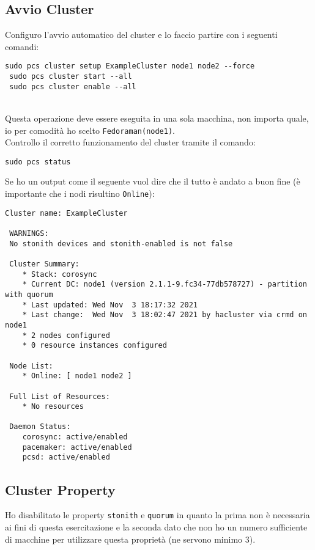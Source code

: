 \subsection{Avvio Cluster}

Configuro l'avvio automatico del cluster e lo faccio partire con i seguenti comandi:

\begin{lstlisting}[style=cmd]
 sudo pcs cluster setup ExampleCluster node1 node2 --force
 sudo pcs cluster start --all
 sudo pcs cluster enable --all
\end{lstlisting}
\ \\
Questa operazione deve essere eseguita in una sola macchina, non importa quale, io per comodit\`{a} ho scelto \lstinline[style=cmd]|Fedoraman(node1)|.
\ \\
Controllo il corretto funzionamento del cluster tramite il comando:

\begin{lstlisting}[style=cmd]
 sudo pcs status
\end{lstlisting}
\pagebreak
Se ho un output come il seguente vuol dire che il tutto \`{e} andato a buon fine (\`{e} importante che i nodi risultino \lstinline[style=cmd]|Online|):

\begin{lstlisting}[style=output]
 Cluster name: ExampleCluster
 
 WARNINGS:
 No stonith devices and stonith-enabled is not false
 
 Cluster Summary:
    * Stack: corosync
    * Current DC: node1 (version 2.1.1-9.fc34-77db578727) - partition with quorum
    * Last updated: Wed Nov  3 18:17:32 2021
    * Last change:  Wed Nov  3 18:02:47 2021 by hacluster via crmd on node1
    * 2 nodes configured
    * 0 resource instances configured
 
 Node List:
    * Online: [ node1 node2 ]
 
 Full List of Resources:
    * No resources
 
 Daemon Status:
    corosync: active/enabled
    pacemaker: active/enabled
    pcsd: active/enabled
\end{lstlisting}

\subsection{Cluster Property}

Ho disabilitato le property \lstinline[style=cmd]|stonith| e \lstinline[style=cmd]|quorum| in quanto la prima non \`{e} necessaria ai fini di questa esercitazione e la seconda dato che non ho un numero sufficiente di macchine per utilizzare questa propriet\`{a} (ne servono minimo 3).


